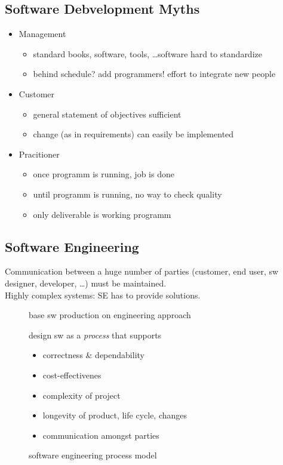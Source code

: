 \documentclass[a4paper, 10pt]{article}
\begin{document}
\subsection{Software Debvelopment Myths}
\begin{itemize}
	\item Management
		\begin{itemize}
			\item standard books, software, tools, \dots \follows software hard to standardize
			\item behind schedule? add programmers! \follows effort to integrate new people
		\end{itemize}
	\item Customer
		\begin{itemize}
			\item general statement of objectives sufficient
			\item change (as in requirements) can easily be implemented
		\end{itemize}
	\item Pracitioner
		\begin{itemize}
			\item once programm is running, job is done
			\item until programm is running, no way to check quality
			\item only deliverable is working programm
		\end{itemize}
\end{itemize}

\subsection{Software Engineering}
Communication between a huge number of parties (customer, end user, sw designer, developer, \dots) must be maintained. \\
Highly complex systems: SE has to provide solutions.

\begin{description}
	\item[\follows] base sw production on engineering approach
	\item[\follows] design sw as a \emph{process} that supports
		\begin{itemize}
			\item correctness \& dependability
			\item cost-effectivenes
			\item complexity of project
			\item longevity of product, life cycle, changes
			\item communication amongst parties
		\end{itemize}
	\item[\follows] software engineering process model
\end{description}
\end{document}

